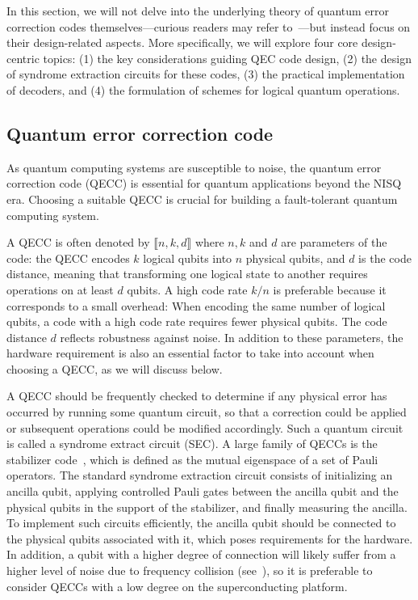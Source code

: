 \documentclass[a4paper,onecolumn,11pt,unpublished]{quantumarticle}
\begin{document}
In this section, we will not delve into the underlying theory of quantum error correction codes themselves---curious readers may refer to~\cite{Nielsen2010Quantum, gottesman2024surviving}---but instead focus on their design-related aspects. More specifically, we will explore four core design-centric topics: (1) the key considerations guiding QEC code design, (2) the design of syndrome extraction circuits for these codes, (3) the practical implementation of decoders, and (4) the formulation of schemes for logical quantum operations.

\subsection{Quantum error correction code}



As quantum computing systems are susceptible to noise, the quantum error correction code (QECC) is essential for quantum applications beyond the NISQ era. Choosing a suitable QECC is crucial for building a fault-tolerant quantum computing system.

A QECC is often denoted by $\llbracket n,k,d\rrbracket$ where $n,k$ and $d$ are parameters of the code: the QECC encodes $k$ logical qubits into $n$ physical qubits, and $d$ is the code distance, meaning that transforming one logical state to another requires operations on at least $d$ qubits. A high code rate $k/n$ is preferable because it corresponds to a small overhead: When encoding the same number of logical qubits, a code with a high code rate requires fewer physical qubits. The code distance $d$ reflects robustness against noise. In addition to these parameters, the hardware requirement is also an essential factor to take into account when choosing a QECC, as we will discuss below.

A QECC should be frequently checked to determine if any physical error has occurred by running some quantum circuit, so that a correction could be applied or subsequent operations could be modified accordingly. Such a quantum circuit is called a syndrome extract circuit (SEC). A large family of QECCs is the stabilizer code~\cite{gottesman1997stabilizer}, which is defined as the mutual eigenspace of a set of Pauli operators. The standard syndrome extraction circuit consists of initializing an ancilla qubit, applying controlled Pauli gates between the ancilla qubit and the physical qubits in the support of the stabilizer, and finally measuring the ancilla. To implement such circuits efficiently, the ancilla qubit should be connected to the physical qubits associated with it, which poses requirements for the hardware. In addition, a qubit with a higher degree of connection will likely suffer from a higher level of noise due to frequency collision (see~), so it is preferable to consider QECCs with a low degree on the superconducting platform.
\end{document}
